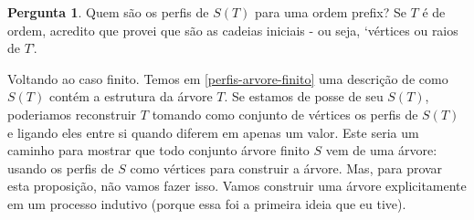 \documentclass[11pt]{article}
\newcommand{\pulinho}{\vspace{.5cm}}
\newcommand{\pracima}[1]{\lfloor #1 \rfloor}
\theoremstyle{definition}
\theoremstyle{definition}
\theoremstyle{definition}
\newtheorem{prop}{Proposição}
\newenvironment{proposicao}{
\definecolor{shadecolor}{HTML}{FFDBDF}
\begin{shaded}
\begin{prop}
}
{
\end{prop}
\end{shaded}
}
\theoremstyle{definition}
\theoremstyle{definition}
\theoremstyle{definition}
\theoremstyle{definition}
\theoremstyle{definition}
\theoremstyle{definition}
\theoremstyle{definition}
\theoremstyle{definition}
\theoremstyle{definition}
\newenvironment{prova}{\paragraph{Demonstração:}}{\hfill$\square$ 
\pulinho
}
\theoremstyle{definition}
\theoremstyle{definition}
\newtheorem{preguta}{Pergunta}
\newenvironment{pergunta}{
\definecolor{shadecolor}{HTML}{FFF8F0}
\begin{shaded}
\begin{preguta}
}
{
\end{preguta}
\end{shaded}
}
\begin{document}







\begin{pergunta}
  Quem são os perfis de $S(T)$ para uma ordem prefix? Se $T$ é de ordem, acredito que provei que são as cadeias iniciais - ou seja, `vértices ou raios de $T$'.
\end{pergunta}


Voltando ao caso finito. Temos em \ref{perfis-arvore-finito} uma descrição de como $S(T)$ contém a estrutura da árvore $T$. Se estamos de posse de seu $S(T)$, poderiamos reconstruir $T$ tomando como conjunto de vértices os perfis de $S(T)$ e ligando eles entre si quando diferem em apenas um valor. Este seria um caminho para mostrar que todo conjunto árvore finito $S$ vem de uma árvore: usando os perfis de $S$ como vértices para construir a árvore. Mas, para provar esta proposição, não vamos fazer isso. Vamos construir uma árvore explicitamente em um processo indutivo (porque essa foi a primeira ideia que eu tive).
\end{document}
